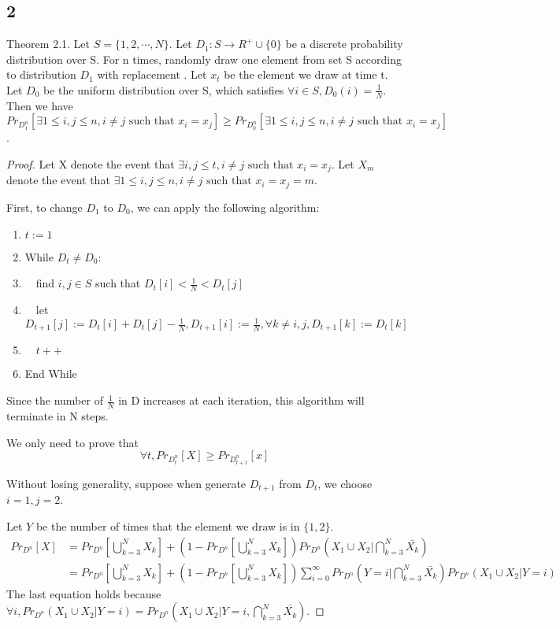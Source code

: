 \documentclass{article}
\begin{document}
\begin{spacing}{1.1}
    \section*{2}
    Theorem 2.1. Let $S = \{1, 2, \cdots, N\}$. Let $D_1: S\to R^+\cup \{0\}$ be a discrete probability distribution over S. For n times, randomly draw one element from set S according to distribution $D_1$ with replacement . Let $x_t$ be the element we draw at time t. Let $D_0$ be the uniform distribution over S, which satisfies $\forall i \in S, D_0(i) = \frac{1}{N}$. Then we have
    $$Pr_{D_1^n}[\exists 1\leq i, j \leq n, i\not = j \text{ such that } x_i = x_j] \geq Pr_{D_0^n}[\exists 1\leq i, j \leq n, i\not = j \text{ such that } x_i = x_j]$$.
    \begin{proof}
        Let X denote the event that $\exists i, j \leq t, i\not = j \text{ such that } x_i = x_j$. Let $X_m$ denote the event that $\exists 1\leq i, j \leq n, i\not = j \text{ such that } x_i = x_j = m$.

        First, to change $D_1$ to $D_0$, we can apply the following algorithm:
        \begin{enumerate}
            \item $t := 1$
            \item While $D_t \not = D_0$:
            \item $\quad$find $i, j \in S$ such that $D_t[i] < \frac{1}{N} < D_t[j]$
            \item $\quad$let $D_{t+1}[j] := D_t[i] + D_t[j] - \frac{1}{N}, D_{t+1}[i] := \frac{1}{N}, \forall k \not = i, j, D_{t+1}[k] := D_t[k]$
            \item $\quad t++$
            \item End While
        \end{enumerate}
        Since the number of $\frac{1}{N}$ in D increases at each iteration, this algorithm will terminate in N steps.

        We only need to prove that $$\forall t, Pr_{D_t^n}[X] \geq Pr_{D_{t+1}^n}[x]$$

        Without losing generality, suppose when generate $D_{t+1}$ from $D_t$, we choose $i = 1, j = 2$.

        Let $Y$ be the number of times that the element we draw is in $\{1, 2\}$.
        \begin{equation}
            \begin{aligned}
                Pr_{D^n}[X] &= Pr_{D^n}[\bigcup_{k = 3}^N X_k] + (1 - Pr_{D^n}[\bigcup_{k = 3}^N X_k])Pr_{D^n}(X_1\cup X_2 | \bigcap_{k = 3}^N \bar{X_k})\\
                &= Pr_{D^n}[\bigcup_{k = 3}^N X_k] + (1 - Pr_{D^n}[\bigcup_{k = 3}^N X_k])\sum_{i=0}^\infty Pr_{D^n}(Y = i | \bigcap_{k = 3}^N \bar{X_k}) Pr_{D^n}(X_1\cup X_2 | Y = i)
            \end{aligned}
        \end{equation}
        The last equation holds because $\forall i, Pr_{D^n}(X_1\cup X_2 | Y = i) = Pr_{D^n}(X_1\cup X_2 | Y = i, \bigcap_{k = 3}^N \bar{X_k})$.


\end{proof}
\end{spacing}
\end{document}
